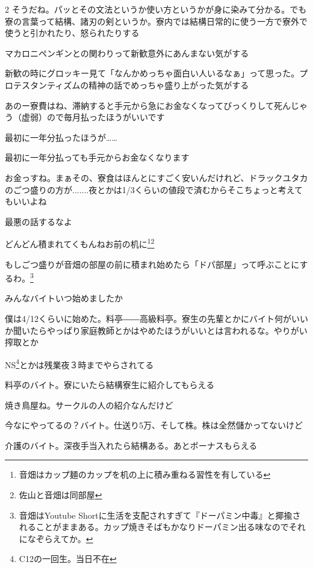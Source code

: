 \begin{multicols}{2}
 そうだね。パッとその文法というか使い方というかが身に染みて分かる。でも寮の言葉って結構、諸刃の剣というか。寮内では結構日常的に使う一方で寮外で使うと引かれたり、怒られたりする

 マカロニペンギンとの関わりって新歓意外にあんまない気がする

 新歓の時にグロッキー見て「なんかめっちゃ面白い人いるなぁ」って思った。プロテスタンティズムの精神の話でめっちゃ盛り上がった気がする


 あのー寮費はね、滞納すると手元から急にお金なくなってびっくりして死んじゃう（虚弱）ので毎月払ったほうがいいです

 最初に一年分払ったほうが……

 最初に一年分払っても手元からお金なくなります

 お金っすね。まぁその、寮食はほんとにすごく安いんだけれど、ドラックユタカのごつ盛りの方が.......夜とかは1/3くらいの値段で済むからそこちょっと考えてもいいよね

 最悪の話するなよ

 どんどん積まれてくもんねお前の机に\footnote{音畑はカップ麺のカップを机の上に積み重ねる習性を有している}\footnote{佐山と音畑は同部屋}

 もしごつ盛りが音畑の部屋の前に積まれ始めたら「ドパ部屋」って呼ぶことにするわ。\footnote{音畑はYoutube Shortに生活を支配されすぎて『ドーパミン中毒』と揶揄されることがままある。カップ焼きそばもかなりドーパミン出る味なのでそれになぞらえてか。}

 みんなバイトいつ始めましたか

 僕は4/12くらいに始めた。料亭――高級料亭。寮生の先輩とかにバイト何がいいか聞いたらやっぱり家庭教師とかはやめたほうがいいとは言われるな。やりがい搾取とか

 NS\footnote{C12の一回生。当日不在}とかは残業夜３時までやらされてる

 料亭のバイト。寮にいたら結構寮生に紹介してもらえる

 焼き鳥屋ね。サークルの人の紹介なんだけど

 今なにやってるの？バイト。仕送り5万、そして株。株は全然儲かってないけど

 介護のバイト。深夜手当入れたら結構ある。あとボーナスもらえる


\end{multicols}
